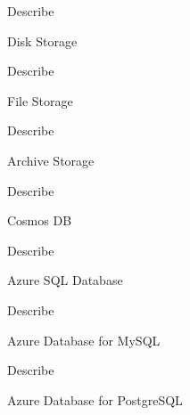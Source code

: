 \documentclass{scrartcl}
\newenvironment{flashcard}[2][]{%
    #1
    \vfill
    \centerline{\Large{#2}}
    \vfill
    \newpage
}
{\newpage}
\begin{document}
    \begin{flashcard}[Describe]{Disk Storage}

    \end{flashcard}

    \begin{flashcard}[Describe]{File Storage}

    \end{flashcard}

    \begin{flashcard}[Describe]{Archive Storage}

    \end{flashcard}

    \begin{flashcard}[Describe]{Cosmos DB}

    \end{flashcard}

    \begin{flashcard}[Describe]{Azure SQL Database}

    \end{flashcard}

    \begin{flashcard}[Describe]{Azure Database for MySQL}

    \end{flashcard}

    \begin{flashcard}[Describe]{Azure Database for PostgreSQL}

    \end{flashcard}
\end{document}

